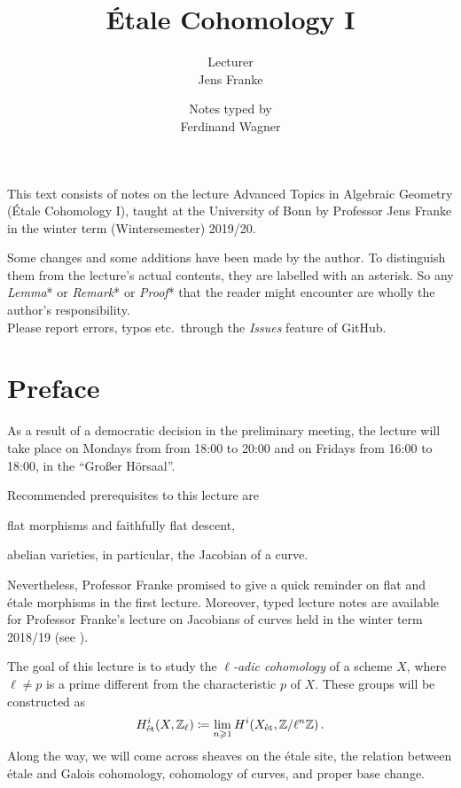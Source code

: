 \documentclass[a4paper, 10pt, oneside, DIV=9, chapterprefix=true, numbers=enddot, bibliography=totoc]{scrbook}
\title{Étale Cohomology I}
\author{{\normalsize Lecturer}\\
	Jens Franke}
\date{{\normalsize Notes typed by}\\
	Ferdinand Wagner}
\begin{document}
\frontmatter
{}
\maketitle
\noindent This text consists of notes on the lecture Advanced Topics in Algebraic Geometry (Étale Cohomology I), taught at the University of
Bonn by Professor Jens Franke in the winter term (Wintersemester) 2019/20.

Some changes and some additions have been made by the author. To distinguish them from the lecture's actual contents, they are labelled with an asterisk. So any \emph{Lemma}* or \emph{Remark}* or \emph{Proof}* that the reader might encounter are wholly the author's responsibility.\\[\thmsep]Please report errors, typos etc.\ through the \emph{Issues} feature of GitHub.


\tableofcontents
{}
\chapter{Preface}
As a result of a democratic decision in the preliminary meeting, the lecture will take place on Mondays from from 18:00 to 20:00 and on Fridays from 16:00 to 18:00, in the \enquote{Großer Hörsaal}.

Recommended prerequisites to this lecture are
\begin{temize}
	\item flat morphisms and faithfully flat descent,
	\item abelian varieties, in particular, the Jacobian of a curve.
\end{temize}
Nevertheless, Professor Franke promised to give a quick reminder on flat and étale morphisms in the first lecture. Moreover, typed lecture notes are available for Professor Franke's lecture on Jacobians of curves held in the winter term 2018/19 (see \cite{jacobians}). 

The goal of this lecture is to study the \emph{$\ell$-adic cohomology} of a scheme $X$, where $\ell\neq p$ is a prime different from the characteristic $p$ of $X$. These groups will be constructed as
\begin{align*}
	H_{\mathrm{\acute{e}t}}^i(X,\mathbb{Z}_\ell)\coloneqq\operatorname*{lim}_{n\geqslant 1}H^i(X_{\mathrm{\acute{e}t}},\mathbb{Z}/\ell^n\mathbb{Z})\,.
\end{align*}
Along the way, we will come across sheaves on the étale site, the relation between étale and Galois cohomology, cohomology of curves, and proper base change.
\end{document}

